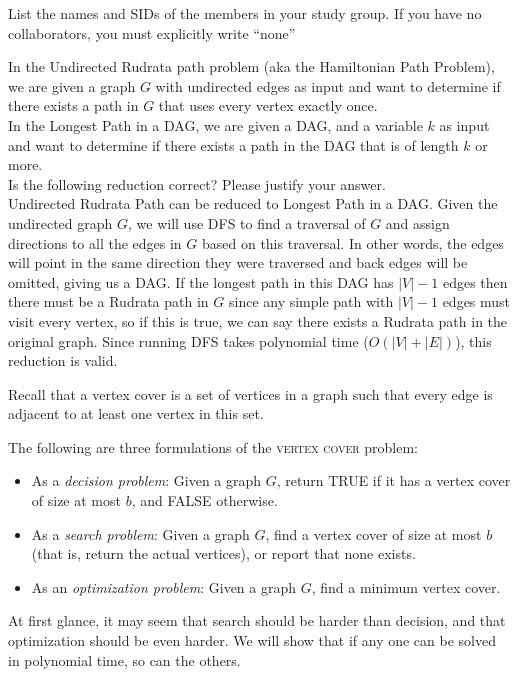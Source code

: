 \documentclass{article}
\begin{document}
List the names and SIDs of the members in your study group.
If you have no collaborators, you must explicitly write ``none''


\noindent In the Undirected Rudrata path problem (aka the Hamiltonian Path Problem), we are given a graph $G$ with undirected edges
as input and want to determine if there exists a path in $G$ that uses every vertex exactly once. \\

\noindent In the Longest Path in a DAG, we are given a DAG, and a variable $k$
as input and want to determine if there exists a path in the DAG that is of length $k$ or more. \\

\noindent Is the following reduction correct? Please justify your answer.\\

\noindent Undirected Rudrata Path can be reduced to Longest Path in a DAG. Given the undirected graph $G$, we will use DFS to find a traversal of $G$
and assign directions to all the edges in $G$ based on this traversal. In other words, the edges will point in the same direction they were traversed and back
edges will be omitted, giving us a DAG. If the longest path in this DAG has $|V| - 1$ edges then there must be a Rudrata path in $G$ since any simple
path with $|V| - 1$ edges must visit every vertex, so if this is true, we can say there exists a Rudrata path in the original graph.
Since running DFS takes polynomial time ($O(|V| + |E|)$), this reduction is valid.



	Recall that a vertex cover is a set of vertices in a graph such that every edge is adjacent to at least one vertex in this set.

	The following are three formulations of the \textsc{vertex cover} problem:
	\begin{itemize}
		\item As a \textit{decision problem}: Given a graph $G$, return TRUE if it has a vertex cover of size at most $b$, and FALSE otherwise.
		\item As a \textit{search problem}: Given a graph $G$, find a vertex cover of size at most $b$ (that is, return the actual vertices), or report that none exists.
		\item As an \textit{optimization problem}: Given a graph $G$, find a minimum vertex cover. \\
	\end{itemize}
	At first glance, it may seem that search should be harder than decision, and that optimization should be even harder. We will show that if any one can be solved in polynomial time, so can the others.
\end{document}
